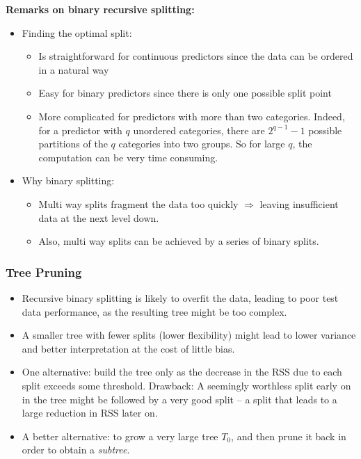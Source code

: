 \documentclass[11pt]{article}
\begin{document}
\noindent \textbf{Remarks on binary recursive splitting:}
\begin{itemize}
    \item Finding the optimal split:
        \begin{itemize}
            \item Is straightforward for continuous predictors since the data can be ordered in a natural way
            \item Easy for binary predictors since there is only one possible split point
            \item More complicated for predictors with more than two categories. Indeed, for a predictor with $q$ unordered categories, there are $2^{q-1}-1$ possible partitions of the $q$ categories into two groups. So for large $q$, the computation can be very time consuming.
        \end{itemize}
    \item Why binary splitting:
        \begin{itemize}
            \item Multi way splits fragment the data too quickly $\Rightarrow$ leaving insufficient data at the next level down.
            \item Also, multi way splits can be achieved by a series of binary splits.
        \end{itemize}
\end{itemize}

\subsubsection{Tree Pruning}
\begin{itemize}
    \item Recursive binary splitting is likely to overfit the data, leading to poor test data performance, as the resulting tree might be too complex.
    \item A smaller tree with fewer splits (lower flexibility) might lead to lower variance and better interpretation at the cost of little bias.
    \item One alternative: build the tree only as the decrease in the RSS due to each split exceeds some threshold. Drawback: A seemingly worthless split early on in the tree might be followed by a very good split -- a split that leads to a large reduction in RSS later on.
    \item A better alternative: to grow a very large tree $T_0$, and then prune it back in order to obtain a \textit{subtree}.
\end{itemize} \phantom{i}
\end{document}
